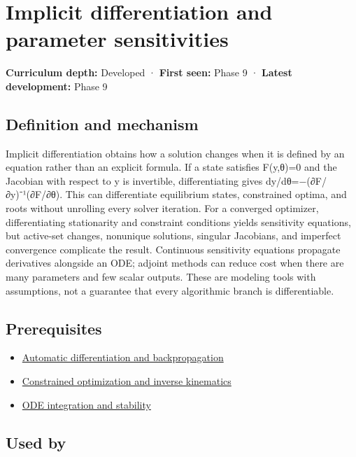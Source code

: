 \hypertarget{appendix-8836553d56fc}{}\label{referencestart:appendix-8836553d56fc}
\section{Implicit differentiation and parameter sensitivities}\label{appendix-8836553d56fc-implicit-differentiation-and-parameter-sensitivities}

\textbf{Curriculum depth:} Developed · \textbf{First seen:} Phase 9 · \textbf{Latest development:} Phase 9

\subsection{Definition and mechanism}\label{appendix-8836553d56fc-definition-and-mechanism}

Implicit differentiation obtains how a solution changes when it is defined by an equation rather than an explicit formula. If a state satisfies F(y,θ)=0 and the Jacobian with respect to y is invertible, differentiating gives dy/dθ=−(∂F/∂y)⁻¹(∂F/∂θ). This can differentiate equilibrium states, constrained optima, and roots without unrolling every solver iteration. For a converged optimizer, differentiating stationarity and constraint conditions yields sensitivity equations, but active-set changes, nonunique solutions, singular Jacobians, and imperfect convergence complicate the result. Continuous sensitivity equations propagate derivatives alongside an ODE; adjoint methods can reduce cost when there are many parameters and few scalar outputs. These are modeling tools with assumptions, not a guarantee that every algorithmic branch is differentiable.

\subsection{Prerequisites}\label{appendix-8836553d56fc-prerequisites}

\begin{itemize}
\tightlist
\item
  \hyperref[appendix-40df0855b4a7]{Automatic differentiation and backpropagation}
\item
  \hyperref[appendix-29f4bea4c2bb]{Constrained optimization and inverse kinematics}
\item
  \hyperref[appendix-18eacf61a04b]{ODE integration and stability}
\end{itemize}

\subsection{Used by}\label{appendix-8836553d56fc-used-by}

